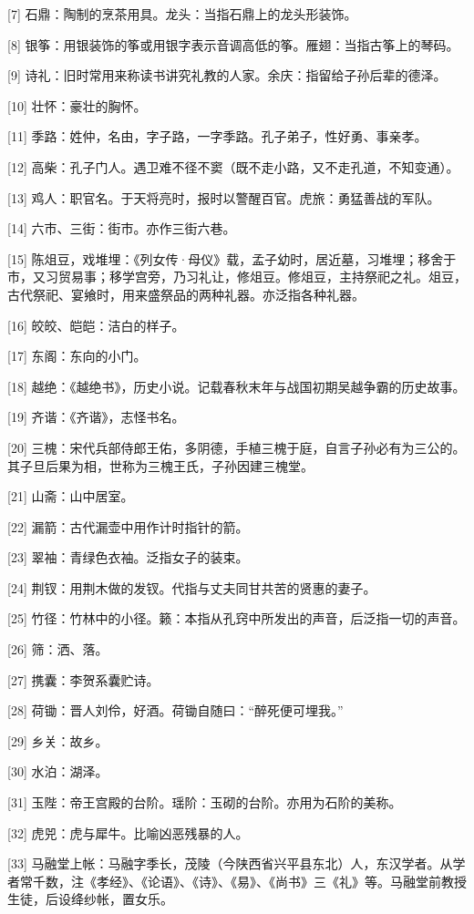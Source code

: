 \documentclass[12pt,UTF8]{ctexbook}
\begin{document}
[7] 石鼎：陶制的烹茶用具。龙头：当指石鼎上的龙头形装饰。

[8] 银筝：用银装饰的筝或用银字表示音调高低的筝。雁翅：当指古筝上的琴码。

[9] 诗礼：旧时常用来称读书讲究礼教的人家。余庆：指留给子孙后辈的德泽。

[10] 壮怀：豪壮的胸怀。

[11] 季路：姓仲，名由，字子路，一字季路。孔子弟子，性好勇、事亲孝。

[12] 高柴：孔子门人。遇卫难不径不窦（既不走小路，又不走孔道，不知变通）。

[13] 鸡人：职官名。于天将亮时，报时以警醒百官。虎旅：勇猛善战的军队。

[14] 六市、三街：街市。亦作三街六巷。

[15] 陈俎豆，戏堆埋：《列女传·母仪》载，孟子幼时，居近墓，习堆埋；移舍于市，又习贸易事；移学宫旁，乃习礼让，修俎豆。修俎豆，主持祭祀之礼。俎豆，古代祭祀、宴飨时，用来盛祭品的两种礼器。亦泛指各种礼器。

[16] 皎皎、皑皑：洁白的样子。

[17] 东阁：东向的小门。

[18] 越绝：《越绝书》，历史小说。记载春秋末年与战国初期吴越争霸的历史故事。

[19] 齐谐：《齐谐》，志怪书名。

[20] 三槐：宋代兵部侍郎王佑，多阴德，手植三槐于庭，自言子孙必有为三公的。其子旦后果为相，世称为三槐王氏，子孙因建三槐堂。

[21] 山斋：山中居室。

[22] 漏箭：古代漏壶中用作计时指针的箭。

[23] 翠袖：青绿色衣袖。泛指女子的装束。

[24] 荆钗：用荆木做的发钗。代指与丈夫同甘共苦的贤惠的妻子。

[25] 竹径：竹林中的小径。籁：本指从孔窍中所发出的声音，后泛指一切的声音。

[26] 筛：洒、落。

[27] 携囊：李贺系囊贮诗。

[28] 荷锄：晋人刘伶，好酒。荷锄自随曰：“醉死便可埋我。”

[29] 乡关：故乡。

[30] 水泊：湖泽。

[31] 玉陛：帝王宫殿的台阶。瑶阶：玉砌的台阶。亦用为石阶的美称。

[32] 虎兕：虎与犀牛。比喻凶恶残暴的人。

[33] 马融堂上帐：马融字季长，茂陵（今陕西省兴平县东北）人，东汉学者。从学者常千数，注《孝经》、《论语》、《诗》、《易》、《尚书》三《礼》等。马融堂前教授生徒，后设绛纱帐，置女乐。
\end{document}
